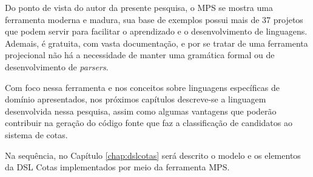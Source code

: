 Do ponto de vista do autor da presente pesquisa, o \gls{MPS} se mostra uma ferramenta moderna e madura, sua base de exemplos possui mais de 37 projetos que podem servir para facilitar o aprendizado e o desenvolvimento de linguagens. Ademais, é gratuita, com vasta documentação, e por se tratar de uma ferramenta projecional não há a necessidade de manter uma gramática formal ou de desenvolvimento de \textit{parsers}.


Com foco nessa ferramenta e nos conceitos sobre linguagens específicas de domínio apresentados, nos próximos capítulos descreve-se a linguagem desenvolvida nessa pesquisa, assim como algumas vantagens que poderão contribuir na geração do código fonte que faz a classificação de candidatos ao sistema de cotas.

Na sequência, no Capítulo \ref{chap:dslcotas} será descrito o modelo e os elementos da DSL Cotas implementados por meio da ferramenta \gls{MPS}.